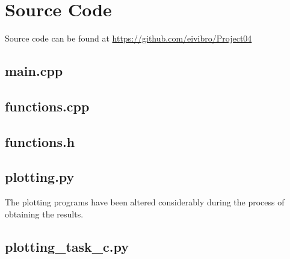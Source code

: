 \documentclass[11pt, a4paper]{article}
\begin{document}
\section{Source Code}
Source code can be found at \url{https://github.com/eivibro/Project04}
\subsection{main.cpp}

\subsection{functions.cpp}

\subsection{functions.h}


\subsection{plotting.py}
The plotting programs have been altered considerably during the process of obtaining the results. 

\subsection{plotting\_task\_c.py}

\end{document}

